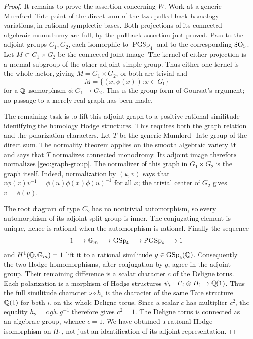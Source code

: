 \begin{proof}
It remains to prove the assertion concerning $W$.  Work at a
generic Mumford--Tate point of the direct sum of the two pulled
back homology variations, in rational symplectic bases.  Both
projections of its connected algebraic monodromy are full, by the
pullback assertion just proved.  Pass to the adjoint groups
$G_1,G_2$, each isomorphic to $\operatorname{PGSp}_4$ and to the
corresponding $\operatorname{SO}_5$.  Let $M\subset G_1\times G_2$ be the
connected joint image.  The kernel of either projection is a
normal subgroup of the other adjoint simple group.  Thus either
one kernel is the whole factor, giving $M=G_1\times G_2$, or both
are trivial and
\begin{equation}\label{geo:graph-group}
 M=\{(x,\phi(x)):x\in G_1\}
\end{equation}
for a $\mathbb Q$-isomorphism $\phi:G_1\to G_2$.  This is the group
form of Goursat's argument; no passage to a merely real graph has
been made.

The remaining task is to lift this adjoint graph to a positive rational
similitude identifying the homology Hodge structures.  This requires
both the graph relation and the polarization characters.
Let $T$ be the generic Mumford--Tate group of the direct sum.
The normality theorem applies on the smooth algebraic variety
$W$ and says that $T$ normalizes connected monodromy.  Its
adjoint image therefore normalizes \eqref{geo:graph-group}.
The normalizer of this graph in $G_1\times G_2$ is the graph
itself.  Indeed, normalization by $(u,v)$ says that
$v\phi(x)v^{-1}=\phi(u)\phi(x)\phi(u)^{-1}$ for all $x$;
the trivial center of $G_2$ gives $v=\phi(u)$.

The root diagram of type $C_2$ has no nontrivial automorphism,
so every automorphism of its adjoint split group is inner.
The conjugating element is unique, hence is rational when the
automorphism is rational.  Finally the sequence
\[
 1\longrightarrow\mathbb G_m\longrightarrow\operatorname{GSp}_4
   \longrightarrow\operatorname{PGSp}_4\longrightarrow1
\]
and $H^1(\mathbb Q,\mathbb G_m)=1$ lift it to a rational similitude
$g\in\operatorname{GSp}_4(\mathbb Q)$.  Consequently the two Hodge homomorphisms,
after conjugation by $g$, agree in the adjoint group.  Their
remaining difference is a scalar character $c$ of the Deligne
torus.  Each polarization is a morphism of Hodge structures
$\psi_i:H_i\otimes H_i\to\mathbb Q(1)$.  Thus the full similitude
character $\nu\circ h_i$ is the character of the same Tate
structure $\mathbb Q(1)$ for both $i$, on the whole Deligne torus.
Since a scalar $c$ has multiplier $c^2$, the equality
$h_2=c\,g h_1g^{-1}$ therefore gives $c^2=1$.
The Deligne torus is connected as an
algebraic group, whence $c=1$.  We have obtained a rational Hodge
isomorphism on $H_1$, not just an identification of its adjoint
representation.


\end{proof}
